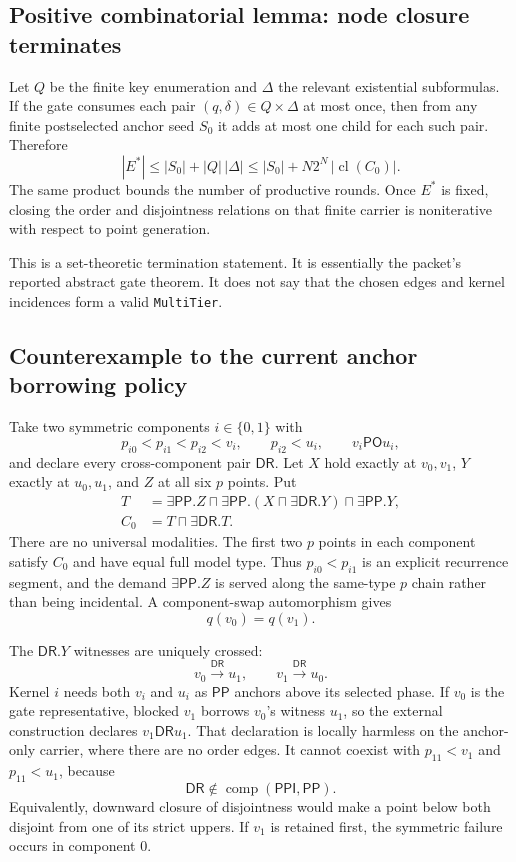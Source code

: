 \documentclass[11pt]{article}
\newcommand{\PP}{\mathsf{PP}}
\newcommand{\PPI}{\mathsf{PPI}}
\newcommand{\PO}{\mathsf{PO}}
\newcommand{\DR}{\mathsf{DR}}
\newcommand{\comp}{\operatorname{comp}}
\newcommand{\cl}{\operatorname{cl}}
\begin{document}
\subsection{Positive combinatorial lemma: node closure terminates}

Let $Q$ be the finite key enumeration and $\Delta$ the relevant existential
subformulas. If the gate consumes each pair $(q,\delta)\in Q\times\Delta$ at most once,
then from any finite postselected anchor seed $S_0$ it adds at most one child for each
such pair. Therefore
\[
  |E^*|\le |S_0|+|Q|\,|\Delta|
       \le |S_0|+N2^N\,|\cl(C_0)|.
\]
The same product bounds the number of productive rounds. Once $E^*$ is fixed, closing
the order and disjointness relations on that finite carrier is noniterative with respect
to point generation.

This is a set-theoretic termination statement. It is essentially the packet's reported
abstract gate theorem. It does not say that the chosen edges and kernel incidences form a
valid \texttt{MultiTier}.

\subsection{Counterexample to the current anchor borrowing policy}

Take two symmetric components $i\in\{0,1\}$ with
\[
  p_{i0}<p_{i1}<p_{i2}<v_i,\qquad p_{i2}<u_i,
  \qquad v_i\mathrel{\PO}u_i,
\]
and declare every cross-component pair $\DR$. Let $X$ hold exactly at $v_0,v_1$,
$Y$ exactly at $u_0,u_1$, and $Z$ at all six $p$ points. Put
\begin{align*}
  T &= \exists\PP.Z\sqcap\exists\PP.(X\sqcap\exists\DR.Y)
       \sqcap\exists\PP.Y,\\
  C_0 &= T\sqcap\exists\DR.T.
\end{align*}
There are no universal modalities. The first two $p$ points in each component satisfy
$C_0$ and have equal full model type. Thus $p_{i0}<p_{i1}$ is an explicit recurrence
segment, and the demand $\exists\PP.Z$ is served along the same-type $p$ chain rather
than being incidental. A component-swap automorphism gives
\[
  q(v_0)=q(v_1).
\]

The $\DR.Y$ witnesses are uniquely crossed:
\[
  v_0\xrightarrow{\DR}u_1,\qquad v_1\xrightarrow{\DR}u_0.
\]
Kernel $i$ needs both $v_i$ and $u_i$ as $\PP$ anchors above its selected phase. If
$v_0$ is the gate representative, blocked $v_1$ borrows $v_0$'s witness $u_1$, so the
external construction declares $v_1\DR u_1$. That declaration is locally harmless on
the anchor-only carrier, where there are no order edges. It cannot coexist with
$p_{11}<v_1$ and $p_{11}<u_1$, because
\[
  \DR\notin\comp(\PPI,\PP).
\]
Equivalently, downward closure of disjointness would make a point below both disjoint
from one of its strict uppers. If $v_1$ is retained first, the symmetric failure occurs
in component 0.
\end{document}
